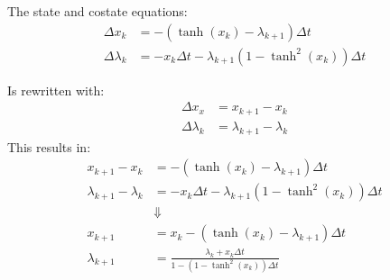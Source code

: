 The state and costate equations:
\begin{equation}
  \begin{split}
    \Delta x_k &= -\left( \tanh{(x_k)} - \lambda_{k + 1} \right)\Delta t \\
    \Delta\lambda_k &= - x_k \Delta t - \lambda_{k + 1} \left( 1 - \tanh^2{(x_k)} \right)\Delta t
  \end{split}
\end{equation}

Is rewritten with:
\begin{equation}
  \begin{split}
    \Delta x_x &= x_{k + 1} - x_k \\
    \Delta \lambda_{k} &= \lambda_{k + 1} - \lambda_{k}
  \end{split}
\end{equation}
This results in:
\begin{equation}
  \begin{split}
    x_{k + 1} - x_k &= -\left( \tanh{(x_k)} - \lambda_{k + 1} \right)\Delta t \\
    \lambda_{k + 1} - \lambda_{k} &= - x_k \Delta t - \lambda_{k + 1} \left( 1 - \tanh^2{(x_k)} \right)\Delta t \\
    &\Downarrow \\
    x_{k + 1} &= x_k - \left( \tanh{(x_k)} - \lambda_{k + 1} \right)\Delta t \\[1mm]
    \lambda_{k + 1} &= \frac{\lambda_k + x_k\Delta t}{1 - \left( 1 - \tanh^2{(x_k)} \right)\Delta t}
  \end{split}
\end{equation}
